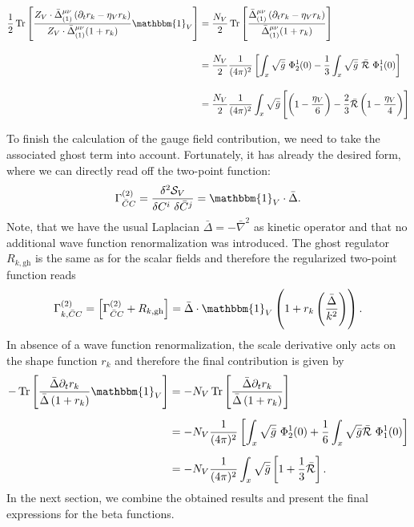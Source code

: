 \begin{align}
	\frac{1}{2}\tr{\frac{Z_V\cdot\bar{\Delta}^{\mu\nu}_{(1)}\left(\partial_t r_k - \eta_Vr_k\right)}{Z_V\cdot\bar{\Delta}^{\mu\nu}_{(1)}(1+r_k)}\mathbbm{1}_V} &= \frac{N_V}{2}\tr{\frac{\bar{\Delta}^{\mu\nu}_{(1)}\left(\partial_t r_k - \eta_Vr_k\right)}{\bar{\Delta}^{\mu\nu}_{(1)}(1+r_k)}}\nonumber \\[10pt]
	&= \frac{N_V}{2}\frac{1}{(4\pi)^2}\left[\int_x\sqrt{\bar{g}}\ \Phi_2^1(0) - \frac{1}{3}\int_x\sqrt{\bar{g}}\  \bar{\mathcal{R}} \  \Phi_1^1(0) \right] \\[10pt]
	&=  \frac{N_V}{2}\frac{1}{(4\pi)^2}\int_x\sqrt{\bar{g}}\left[\left(1-\frac{\eta_V}{6}\right)- \frac{2}{3}\bar{\mathcal{R}}\left(1-\frac{\eta_V}{4}\right)\right]\nonumber
\end{align}


To finish the calculation of the gauge field contribution, we need to take the associated ghost term into account. Fortunately, it has already the desired form, where we can directly read off the two-point function:
\begin{equation}
	\Gamma^{(2)}_{\bar{C}C} = \frac{\delta^2 \mathcal{S}_V}{\delta C^{i}\ \delta \bar{C}^{j}} = \mathbbm{1}_V\cdot\bar{\Delta}.
\end{equation} 
Note, that we have the usual Laplacian $\bar{\Delta} = -\bar{\nabla}^2$ as kinetic operator and that no additional wave function renormalization was introduced. The ghost regulator $R_{k, \mathrm{gh}}$ is the same as for the scalar fields and therefore the regularized two-point function reads
\begin{equation}
		\Gamma^{(2)}_{k, \bar{C}C} = \left[\Gamma^{(2)}_{ \bar{C}C}+ R_{k, \mathrm{gh}}\right]  = \bar{\Delta}\cdot\mathbbm{1}_V\left(1 + r_k\left(\frac{\bar{\Delta}}{k^2}\right)\right).
\end{equation} 
In absence of a wave function renormalization, the scale derivative only acts on the shape function $r_k$ and  therefore the final contribution is given by 
\begin{equation}
\begin{aligned}
	-\tr{\frac{\bar{\Delta}\partial_tr_k}{\bar{\Delta}\left(1+r_k\right)}\mathbbm{1}_V} &= -N_{V}\tr{\frac{\bar{\Delta}\partial_tr_k}{\bar{\Delta}\left(1+r_k\right)}} \\[5pt]
	&= -N_V\frac{1}{(4\pi)^2}\left[\int_x\sqrt{\bar{g}} \ \Phi_2^1(0) + \frac{1}{6}\int_x\sqrt{\bar{g}} \bar{\mathcal{R}} \ \Phi_1^1(0) \right] \\[5pt]
	&= -N_V\frac{1}{(4\pi)^2}\int_x\sqrt{\bar{g}}\left[1 + \frac{1}{3}\bar{\mathcal{R}}\right].	
\end{aligned}
\end{equation}  
In the next section, we combine the obtained results and present the final expressions for the beta functions. 
